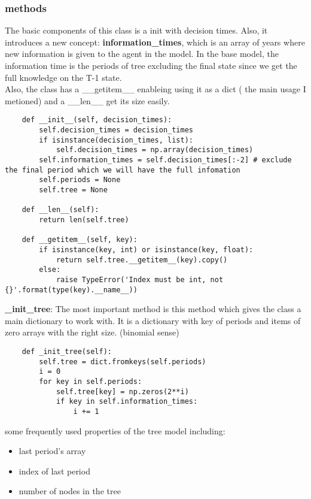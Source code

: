 \documentclass[12pt]{article}
\begin{document}
\subsubsection{methods}
The basic components of this class is a init with decision times. Also, it introduces a new concept: \textbf{information\_times}, which is an array of years where new information is given to the agent in the model. In the base model, the information time is the periods of tree excluding the final state since we get the full knowledge on the T-1 state.\\
Also, the class has a \_\_getitem\_\_ enableing using it as a dict ( the main usage I metioned) and a \_\_len\_\_ get its size easily.
\begin{verbatim}
	def __init__(self, decision_times):
		self.decision_times = decision_times
		if isinstance(decision_times, list):
			self.decision_times = np.array(decision_times)
		self.information_times = self.decision_times[:-2] # exclude the final period which we will have the full infomation
		self.periods = None
		self.tree = None

	def __len__(self):
		return len(self.tree)

	def __getitem__(self, key):
		if isinstance(key, int) or isinstance(key, float):
			return self.tree.__getitem__(key).copy()
		else:
			raise TypeError('Index must be int, not {}'.format(type(key).__name__))
\end{verbatim}
\textbf{\_init\_tree}: The most important method is this method which gives the class a main dictionary to work with. It is a dictionary with key of periods and items of zero arrays with the right size. (binomial sense)
\begin{verbatim}
	def _init_tree(self):
		self.tree = dict.fromkeys(self.periods)
		i = 0
		for key in self.periods:
			self.tree[key] = np.zeros(2**i)
			if key in self.information_times:
				i += 1
\end{verbatim}
some frequently used properties of the tree model including:
\begin{itemize}
  \item last period's array
  \item index of last period
  \item number of nodes in the tree
\end{itemize}
\end{document}
